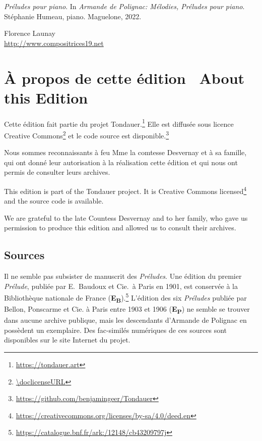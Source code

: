 \documentclass[a4paper, 12pt]{book}
\newcommand{\source}[2]{\textbf{#1\textsubscript{#2}}}
\newcommand{\bigdot}[0]{{\Large \textbullet}}
\newcommand{\centerbigdot}[0]{\begin{center}\bigdot\end{center}}
\begin{document}
\begin{otherlanguage}{english}
\begin{hangparas}{.5cm}{1}
  \emph{Préludes pour piano}. In \emph{Armande de Polignac: Mélodies, Préludes pour piano}.
  Stéphanie Humeau, piano. Maguelone, 2022.

\end{hangparas}

\vspace{\baselineskip}

\hfill
\begin{minipage}[t]{0.55\textwidth}
  Florence Launay \\
  {\small \url{http://www.compositrices19.net}}
\end{minipage}

\end{otherlanguage}

\chapter*{À propos de cette édition
  \bigdot\ \foreignlanguage{english}{About this Edition}}

Cette édition fait partie du projet
Tondauer.\footnote{\url{https://tondauer.art}\label{project}} Elle est
diffusée sous licence Creative Commons\footnote{\url{\doclicenseURL}}
et le code source est
disponible.\footnote{\url{https://github.com/benjamingeer/Tondauer}\label{source-code}}

Nous sommes reconnaissants à feu Mme la comtesse Desvernay et à sa famille,
qui ont donné leur autorisation à la réalisation cette édition et qui nous ont permis
de consulter leurs archives.

\centerbigdot

\begin{otherlanguage}{english}
  This edition is part of the Tondauer project. It is
  Creative Commons
  licensed\footnote{\url{https://creativecommons.org/licenses/by-sa/4.0/deed.en}}
  and the source code is available.

  We are grateful to the late Countess Desvernay and to her family, who gave us
  permission to produce this edition and allowed us to consult their archives.
\end{otherlanguage}
    
\section*{Sources}
  Il ne semble pas subsister de manuscrit des \emph{Préludes}. Une édition du
  premier \emph{Prélude}, publiée par E.\ Baudoux et Cie.\ à Paris en 1901,
  est conservée à la Bibliothèque nationale de France
  (\source{E}{B}).\footnote{\url{https://catalogue.bnf.fr/ark:/12148/cb43209797j}\label{BnF}}
  L'édition des six \emph{Préludes} publiée par Bellon, Ponscarme et Cie. à
  Paris entre 1903 et 1906 (\source{E}{P}) ne semble se trouver dans
  aucune archive publique, mais les descendants d'Armande de Polignac
  en possèdent un exemplaire. Des fac-similés numériques de ces
  sources sont disponibles sur le site Internet du
  projet.
  
\end{document}
